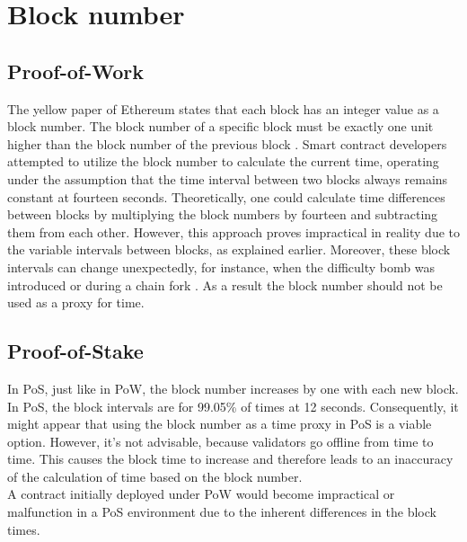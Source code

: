 \section{Block number}
\subsection{Proof-of-Work}
The yellow paper of Ethereum states that each block has
an integer value as a block number. The block number
of a specific block must be exactly one unit higher than the block
number of the previous block \cite{ethyellowpaper2023}.
Smart contract developers attempted to utilize the block number to calculate
the current time, operating under the assumption that the time interval between
two blocks always remains constant at fourteen seconds. Theoretically, one could
calculate time differences between blocks by multiplying the block numbers by fourteen 
and subtracting them from each other.
However, this approach proves impractical in reality due to the variable
intervals between blocks, as explained earlier. Moreover, these block intervals
can change unexpectedly, for instance, when the difficulty bomb was introduced
or during a chain fork \cite{swc116}.
As a result the block number should not be used as a proxy for time.

%

\subsection{Proof-of-Stake}
In PoS, just like in PoW, the block number increases by one with each new
block. In PoS, the block intervals are for 99.05\% of times at 12 seconds. Consequently,
it might appear that using the block number as a time proxy in PoS is a viable
option. However, it's not advisable, because validators go offline from time to
time. This causes the block time to increase and therefore leads to an
inaccuracy of the calculation of time based on the block number. \\
A contract initially deployed under PoW would
become impractical or malfunction in a PoS environment due to the inherent differences in the block times.

